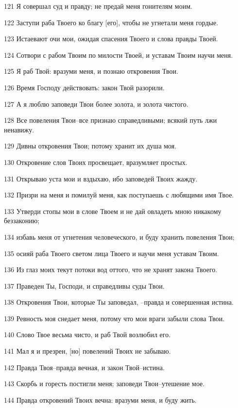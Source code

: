 \par 121 Я совершал суд и правду; не предай меня гонителям моим.
\par 122 Заступи раба Твоего ко благу [его], чтобы не угнетали меня гордые.
\par 123 Истаевают очи мои, ожидая спасения Твоего и слова правды Твоей.
\par 124 Сотвори с рабом Твоим по милости Твоей, и уставам Твоим научи меня.
\par 125 Я раб Твой: вразуми меня, и познаю откровения Твои.
\par 126 Время Господу действовать: закон Твой разорили.
\par 127 А я люблю заповеди Твои более золота, и золота чистого.
\par 128 Все повеления Твои--все признаю справедливыми; всякий путь лжи ненавижу.
\par 129 Дивны откровения Твои; потому хранит их душа моя.
\par 130 Откровение слов Твоих просвещает, вразумляет простых.
\par 131 Открываю уста мои и вздыхаю, ибо заповедей Твоих жажду.
\par 132 Призри на меня и помилуй меня, как поступаешь с любящими имя Твое.
\par 133 Утверди стопы мои в слове Твоем и не дай овладеть мною никакому беззаконию;
\par 134 избавь меня от угнетения человеческого, и буду хранить повеления Твои;
\par 135 осияй раба Твоего светом лица Твоего и научи меня уставам Твоим.
\par 136 Из глаз моих текут потоки вод оттого, что не хранят закона Твоего.
\par 137 Праведен Ты, Господи, и справедливы суды Твои.
\par 138 Откровения Твои, которые Ты заповедал, --правда и совершенная истина.
\par 139 Ревность моя снедает меня, потому что мои враги забыли слова Твои.
\par 140 Слово Твое весьма чисто, и раб Твой возлюбил его.
\par 141 Мал я и презрен, [но] повелений Твоих не забываю.
\par 142 Правда Твоя--правда вечная, и закон Твой--истина.
\par 143 Скорбь и горесть постигли меня; заповеди Твои--утешение мое.
\par 144 Правда откровений Твоих вечна: вразуми меня, и буду жить.
